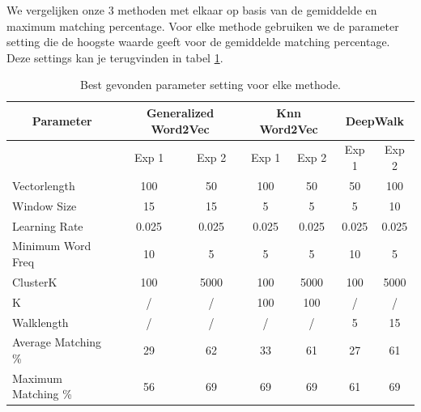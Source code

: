 \documentclass[11pt, final, journal, twoside, a4paper]{IEEEtran}
\begin{document}
We vergelijken onze $3$ methoden met elkaar op basis van de gemiddelde en maximum matching percentage. Voor elke methode gebruiken we de parameter setting die de hoogste waarde geeft voor de gemiddelde matching percentage. Deze settings kan je terugvinden in tabel \ref{tab:approaches}. \\

\begin{table}[!htb]
\centering
\begin{tabular}{ccccccc}
\hline
Parameter                                   & \multicolumn{2}{c}{Generalized Word2Vec}         & \multicolumn{2}{c}{Knn Word2Vec}                 & \multicolumn{2}{c}{DeepWalk} \\ \hline
\multicolumn{1}{l|}{}                       & Exp 1 & \multicolumn{1}{c|}{Exp 2} & Exp 1 & \multicolumn{1}{c|}{Exp 2} & Exp 1  & Exp 2 \\ \hline
\multicolumn{1}{l|}{Vectorlength}           & 100          & \multicolumn{1}{c|}{50}           & 100          & \multicolumn{1}{c|}{50}           & 50            & 100          \\
\multicolumn{1}{l|}{Window Size}            & 15           & \multicolumn{1}{c|}{15}           & 5            & \multicolumn{1}{c|}{5}            & 5             & 10           \\
\multicolumn{1}{l|}{Learning Rate}          & 0.025        & \multicolumn{1}{c|}{0.025}        & 0.025        & \multicolumn{1}{c|}{0.025}        & 0.025         & 0.025        \\
\multicolumn{1}{l|}{Minimum Word Freq} & 10           & \multicolumn{1}{c|}{5}            & 5            & \multicolumn{1}{c|}{5}            & 10            & 5            \\
\multicolumn{1}{l|}{ClusterK}               & 100          & \multicolumn{1}{c|}{5000}         & 100          & \multicolumn{1}{c|}{5000}         & 100           & 5000         \\
\multicolumn{1}{l|}{K}                      & /            & \multicolumn{1}{c|}{/}            & 100          & \multicolumn{1}{c|}{100}          & /             & /            \\ 
\multicolumn{1}{l|}{Walklength}             & /            & \multicolumn{1}{c|}{/}            & /            & \multicolumn{1}{c|}{/}            & 5             & 15           \\ \hline
\multicolumn{1}{l|}{Average Matching \%}    & 29           & \multicolumn{1}{c|}{62}           & 33           & \multicolumn{1}{c|}{61}           & 27            & 61           \\
\multicolumn{1}{l|}{Maximum Matching \%}    & 56           & \multicolumn{1}{c|}{69}           & 69           & \multicolumn{1}{c|}{69}           & 61            & 69          
\end{tabular}

\caption{Best gevonden parameter setting voor elke methode.}
\label{tab:approaches}
\end{table}
\end{document}
